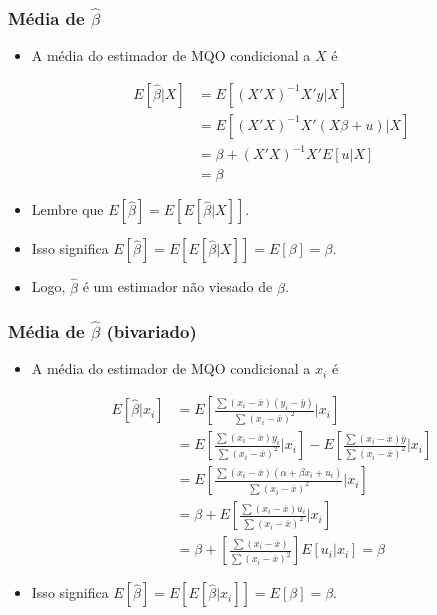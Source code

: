\documentclass[10pt,slides,xcolor=pdftex,dvipsnames,table]{beamer}
\begin{document}
\begin{frame}[fragile]
	\frametitle{Média de $\widehat{\beta}$}

\begin{itemize}\itemsep1.2em

\item A média do estimador de MQO condicional a $X$ é

\begin{align*}
E [\widehat{\beta} | X] &= E \left[ (X'X)^{-1} X'y | X \right] \\
&= E \left[ (X'X)^{-1} X'(X \beta + u) | X \right] \\
&= \beta + (X'X)^{-1} X' E[u | X] \\ 
&= \beta 
\end{align*}

\item Lembre que $E[\widehat{\beta}] = E \left[E [\widehat{\beta} | X] \right]$.

\item Isso significa $E[\widehat{\beta}] = E \left[E [\widehat{\beta} | X] \right] = E[\beta]=\beta$.  

\item Logo, $\widehat{\beta}$ é um estimador não viesado de $\beta$.

\end{itemize}

\end{frame}


\begin{frame}[fragile]
	\frametitle{Média de $\widehat{\beta}$ (bivariado)}

\begin{itemize}\itemsep1.2em

\item A média do estimador de MQO condicional a $x_i$ é

\begin{align*}
E [\widehat{\beta} | x_i] &= E \left[ \frac{\sum (x_i - \overline{x})(y_i - \overline{y})}{\sum (x_i - \overline{x})^2} | x_i \right] \\
&= E \left[ \frac{\sum (x_i - \overline{x})y_i}{\sum (x_i - \overline{x})^2} | x_i \right] - E \left[ \frac{\sum (x_i - \overline{x}) \overline{y}}{\sum (x_i - \overline{x})^2} | x_i \right] \\
&= E \left[ \frac{\sum (x_i - \overline{x}) (\alpha + \beta x_i + u_i) }{\sum (x_i - \overline{x})^2} | x_i \right] \\
&= \beta + E \left[ \frac{\sum (x_i - \overline{x}) u_i}{\sum (x_i - \overline{x})^2} | x_i \right] \\
&= \beta + \left[ \frac{\sum (x_i - \overline{x})}{\sum (x_i - \overline{x})^2} \right] E \left[ u_i | x_i \right] = \beta
\end{align*}

\item Isso significa $E[\widehat{\beta}] = E \left[E [\widehat{\beta} | x_i] \right] = E[\beta]=\beta$. 

\end{itemize}

\end{frame}
\end{document}
